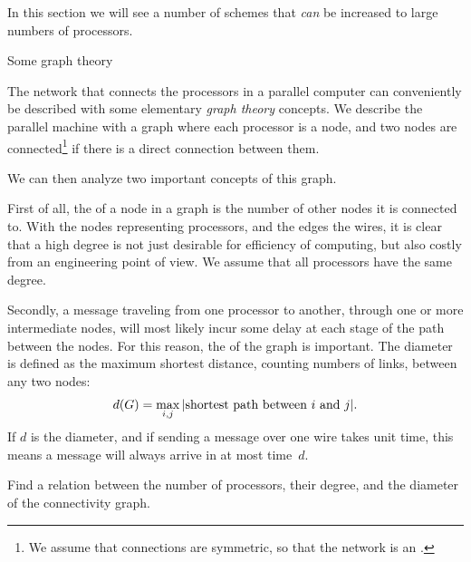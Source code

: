 In this section we will see a number of schemes that \emph{can} be
increased to large numbers of processors.

 {Some graph theory}
\label{sec:graph-theory}

The network that connects the processors in a parallel computer can
conveniently be described with some elementary \emph{graph
  theory} concepts. We
describe the parallel machine with a graph where each processor is a
node, and two nodes are connected\footnote{We assume that connections
  are symmetric, so that the network is an
  .} if there is a direct connection
between them.

We can then analyze two
important concepts of this graph.

First of all, the  of a node in a graph is the
number of other nodes it is connected to. With the nodes representing
processors, and the edges the wires, it is clear that a high degree
is not just desirable for efficiency of computing, but also costly
from an engineering point of view. We assume that all processors have
the same degree.

Secondly, a message traveling from one processor to another, through
one or more intermediate nodes, will most likely incur some delay at each
stage of the path between the nodes.
For this reason, the  of the
graph is important. The diameter is defined as the maximum shortest
distance, counting numbers of links, between any two nodes:
\[ d(G) = \max_{i,j}|\hbox{shortest path between $i$ and $j$}|. \]
If $d$ is the diameter,
and if sending a message over one wire takes unit time,
this means a message will always arrive in at most time~$d$.

\begin{exercise}
  Find a relation between the number of processors, their degree,
  and the diameter of the connectivity graph.
\end{exercise}

